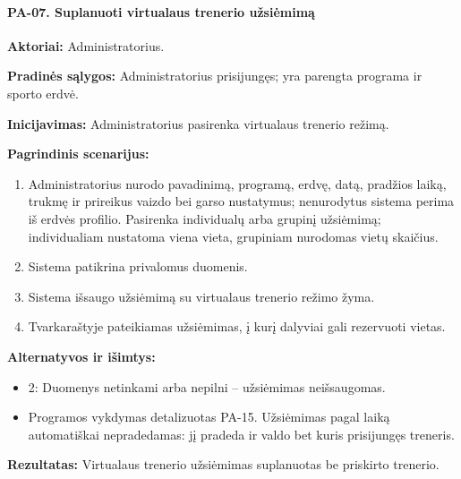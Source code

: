 \paragraph{PA-07. Suplanuoti virtualaus trenerio užsiėmimą}\mbox{}\par
\textbf{Aktoriai:} Administratorius.\par
\textbf{Pradinės sąlygos:} Administratorius prisijungęs; yra parengta programa ir sporto erdvė.\par
\textbf{Inicijavimas:} Administratorius pasirenka virtualaus trenerio režimą.\par
\textbf{Pagrindinis scenarijus:}
\begin{enumerate}
\item Administratorius nurodo pavadinimą, programą, erdvę, datą, pradžios laiką, trukmę ir prireikus vaizdo bei garso nustatymus; nenurodytus sistema perima iš erdvės profilio. Pasirenka individualų arba grupinį užsiėmimą; individualiam nustatoma viena vieta, grupiniam nurodomas vietų skaičius.
\item Sistema patikrina privalomus duomenis.
\item Sistema išsaugo užsiėmimą su virtualaus trenerio režimo žyma.
\item Tvarkaraštyje pateikiamas užsiėmimas, į kurį dalyviai gali rezervuoti vietas.
\end{enumerate}
\textbf{Alternatyvos ir išimtys:}
\begin{itemize}
\item 2: Duomenys netinkami arba nepilni -- užsiėmimas neišsaugomas.
\item Programos vykdymas detalizuotas PA-15. Užsiėmimas pagal laiką automatiškai nepradedamas: jį pradeda ir valdo bet kuris prisijungęs treneris.
\end{itemize}
\textbf{Rezultatas:} Virtualaus trenerio užsiėmimas suplanuotas be priskirto trenerio.\par
{}
